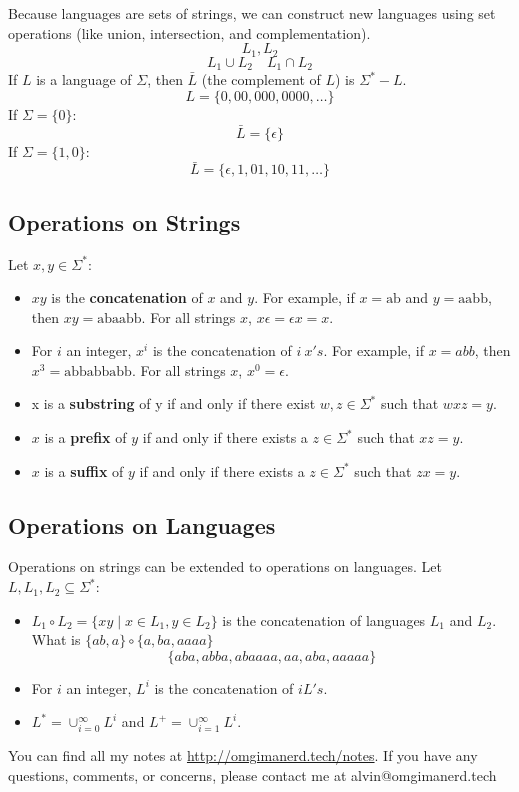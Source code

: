 \documentclass[letterpaper, 12pt]{math}
\begin{document}
Because languages are sets of strings, we can construct new languages using
set operations (like union, intersection, and complementation).
\[ L_{1}, L_{2} \]
\[ L_{1}\cup L_{2} \quad L_{1}\cap L_{2} \]
If \( L \) is a language of \( \Sigma \), then \( \bar{L} \) (the complement of
\( L \)) is \( \Sigma^*-L \).
\[ L = \{0,00,000,0000,\dots\} \]
If \( \Sigma = \{0\} \):
\[ \bar{L} = \{\epsilon\} \]
If \( \Sigma = \{1,0\} \):
\[ \bar{L} = \{\epsilon,1,01,10,11,\dots\} \]

\subsection*{Operations on Strings}
Let \( x,y\in\Sigma^* \):
\begin{itemize}
  \item \( xy \) is the \textbf{concatenation} of \( x \) and \( y \). For
    example, if \( x = \text{ab} \) and \( y = \text{aabb} \), then \( xy =
    \text{abaabb} \). For all strings \( x \), \( x\epsilon = \epsilon x =
    x \).
  \item For \( i \) an integer, \( x^i \) is the concatenation of \( i\ x's \).
    For example, if \( x = abb \), then \( x^{3} = \text{abbabbabb} \). For all
    strings \( x \), \( x^0 = \epsilon \).
  \item x is a \textbf{substring} of y if and only if there exist \( w,z\in
    \Sigma^* \) such that \( wxz = y \).
  \item \( x \) is a \textbf{prefix} of \( y \) if and only if there exists a
    \( z\in\Sigma^* \) such that \( xz = y \).
  \item \( x \) is a \textbf{suffix} of \( y \) if and only if there exists a
    \( z\in\Sigma^* \) such that \( zx = y \).
\end{itemize}

\subsection*{Operations on Languages}
Operations on strings can be extended to operations on languages. Let
\( L,L_1,L_2\subseteq\Sigma^* \):
\begin{itemize}
  \item \( L_1\circ L_2 = \{xy\mid x\in L_1,y\in L_2\} \) is the concatenation
    of languages \( L_1 \) and \( L_2 \). What is \( \{ab,a\}\circ\{a,ba,aaaa\}
    \)
    \[ \{aba,abba,abaaaa,aa,aba,aaaaa\} \]
  \item For \( i \) an integer, \( L^i \) is the concatenation of \( i L's \).
  \item \( L^* = \cup_{i=0}^{\infty}L^i \) and
    \( L^+ = \cup_{i=1}^{\infty}L^i \).
\end{itemize}

\begin{center}
  You can find all my notes at \url{http://omgimanerd.tech/notes}. If you have
  any questions, comments, or concerns, please contact me at
  alvin@omgimanerd.tech
\end{center}
\end{document}
